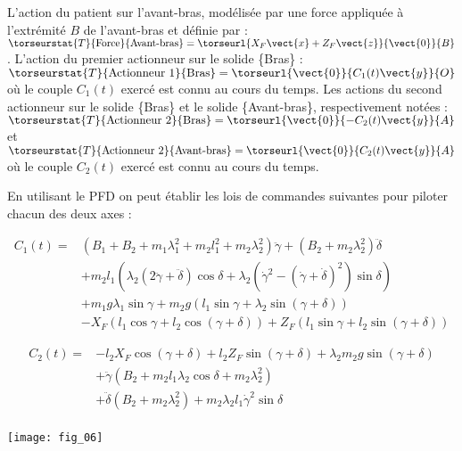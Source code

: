\begin{multicols}{2}
L’action du patient sur l’avant-bras, modélisée par une force appliquée à l’extrémité $B$ de l’avant-bras et
définie par : 
$\torseurstat{T}{\text{Force}}{\text{Avant-bras}}=\torseurl{X_F\vect{x}+Z_F\vect{z}}{\vect{0}}{B}$. 
L’action du premier actionneur sur le solide \{Bras\} : $\torseurstat{T}{\text{Actionneur 1}}{\text{Bras}}=\torseurl{\vect{0}}{C_1(t) \vect{y}}{O}$ où le couple $C_1(t)$ exercé est connu au cours du temps.
Les actions du second actionneur sur le solide \{Bras\} et le solide \{Avant-bras\}, respectivement notées :
$\torseurstat{T}{\text{Actionneur 2}}{\text{Bras}}=\torseurl{\vect{0}}{-C_2(t) \vect{y}}{A}$ et 
$\torseurstat{T}{\text{Actionneur 2}}{\text{Avant-bras}}=\torseurl{\vect{0}}{C_2(t) \vect{y}}{A}$ où le couple $C_2(t)$ exercé est connu au cours du temps.

En utilisant le PFD on peut établir les lois de commandes suivantes pour piloter chacun des deux axes : 

\footnotesize
$$
\begin{array}{ll}
C_1(t)=&
\left(B_1+B_2 +m_1 \lambda_1^2 + m_2 l_1^2 + m_2 \lambda_2^2 \right)\ddot{\gamma} +\left( B_2 + m_2\lambda_2^2\right) \ddot{\delta}\\
& +m_2 l_1 \left( \lambda_2 \left(2\ddot{\gamma}+\ddot{\delta} \right)\cos \delta + \lambda_2 \left( \dot{\gamma}^2-\left( \dot{\gamma} + \dot{\delta}\right)^2\right) \sin\delta\right) \\
& + m_1g\lambda_1\sin\gamma + m_2 g \left(l_1 \sin \gamma+\lambda_2 \sin \left(\gamma+ \delta\right) \right)\\
& -X_F \left( l_1 \cos \gamma +l_2 \cos \left( \gamma+\delta\right) \right) + Z_F \left( l_1 \sin \gamma + l_2 \sin \left( \gamma + \delta \right)\right)
\end{array}
$$


$$
\begin{array}{ll}
C_2(t) =&  - l_2X_F \cos \left(\gamma+\delta\right) 
             + l_2 Z_F \sin \left(\gamma+\delta\right) 
             + \lambda_2m_2g\sin \left(\gamma+\delta\right) \\
&  + \ddot{\gamma}\left(B_2+m_2l_1\lambda_2 \cos\delta + m_2\lambda_2^2\right) \\
& +\ddot{\delta}\left(B_2+ m_2 \lambda_2^2\right) +m_2\lambda_2 l_1 \dot{\gamma}^2 \sin \delta \\
\end{array}
$$

\normalsize

\begin{center}
\texttt{[image: fig\_06]}
\end{center}



\end{multicols}
